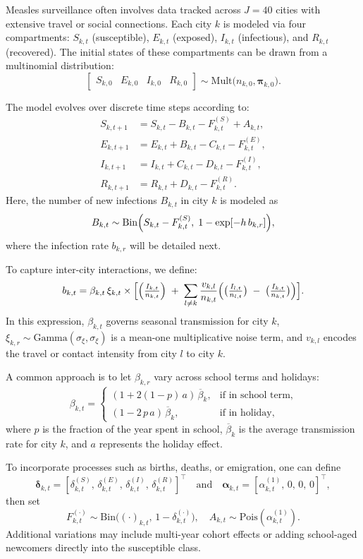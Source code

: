 \documentclass{article}
\begin{document}
Measles surveillance often involves data tracked across $J=40$ cities with extensive travel or social connections. Each city $k$ is modeled via four compartments: $S_{k,t}$ (susceptible), $E_{k,t}$ (exposed), $I_{k,t}$ (infectious), and $R_{k,t}$ (recovered). The initial states of these compartments can be drawn from a multinomial distribution:
\[
\begin{bmatrix}
S_{k,0} & E_{k,0} & I_{k,0} & R_{k,0}
\end{bmatrix}
\sim
\mathrm{Mult}\bigl(n_{k,0}, \boldsymbol{\pi}_{k,0}\bigr).
\]

The model evolves over discrete time steps according to:
\[
\begin{alignedat}{2}
    S_{k,t+1} &= S_{k,t} - B_{k,t} - F^{(S)}_{k,t} + A_{k,t},\\ 
    E_{k,t+1} &= E_{k,t} + B_{k,t} - C_{k,t} - F^{(E)}_{k,t},\\
    I_{k,t+1} &= I_{k,t} + C_{k,t} - D_{k,t} - F^{(I)}_{k,t},\\
    R_{k,t+1} &= R_{k,t} + D_{k,t} - F^{(R)}_{k,t}.
\end{alignedat}
\]
Here, the number of new infections $B_{k,t}$ in city $k$ is modeled as
\[
B_{k,t}
\sim 
\mathrm{Bin}\Bigl(S_{k,t} - F^{(S)}_{k,t},\;1 - \exp[-h\,b_{k,r}]\Bigr),
\]
where the infection rate $b_{k,r}$ will be detailed next.

To capture inter-city interactions, we define:
\[
b_{k,t}
=
\beta_{k,t}\,\xi_{k,t}
\times
\Bigl[
  \Bigl(\tfrac{I_{k,t}}{n_{k,t}}\Bigr)
  \;+\; 
  \sum_{l \neq k} \frac{v_{k,l}}{n_{k,t}}\Bigl(
    \bigl(\tfrac{I_{l,t}}{n_{l,t}}\bigr)
    \;-\;
    \bigl(\tfrac{I_{k,t}}{n_{k,t}}\bigr)
  \Bigr)
\Bigr].
\]
In this expression, $\beta_{k,t}$ governs seasonal transmission for city $k$, $\xi_{k,r}\sim \mathrm{Gamma}(\sigma_{\xi},\sigma_{\xi})$ is a mean-one multiplicative noise term, and $v_{k,l}$ encodes the travel or contact intensity from city $l$ to city $k$.

A common approach is to let $\beta_{k,r}$ vary across school terms and holidays:
\[
\beta_{k,t}
=
\begin{cases}
(1 + 2(1-p)\,a)\,\overline{\beta}_{k}, & \text{if in school term},\\
(1 - 2\,p\,a)\,\overline{\beta}_{k}, & \text{if in holiday},
\end{cases}
\]
where $p$ is the fraction of the year spent in school, $\overline{\beta}_{k}$ is the average transmission rate for city $k$, and $a$ represents the holiday effect.

To incorporate processes such as births, deaths, or emigration, one can define
\[
\boldsymbol{\delta}_{k,t} 
= 
[\delta_{k,t}^{(S)},\,\delta_{k,t}^{(E)},\,\delta_{k,t}^{(I)},\,\delta_{k,t}^{(R)}]^\top 
\quad\text{and}\quad
\boldsymbol{\alpha}_{k,t}
= 
[\alpha_{k,t}^{(1)},\,0,\,0,\,0]^\top,
\]
then set
\[
F_{k,t}^{(\cdot)} 
\sim 
\mathrm{Bin}\bigl((\cdot)_{k,t},\,1 - \delta_{k,t}^{(\cdot)}\bigr),
\quad
A_{k,t} 
\sim
\mathrm{Pois}(\alpha_{k,t}^{(1)}).
\]
Additional variations may include multi-year cohort effects or adding school-aged newcomers directly into the susceptible class.
\end{document}
